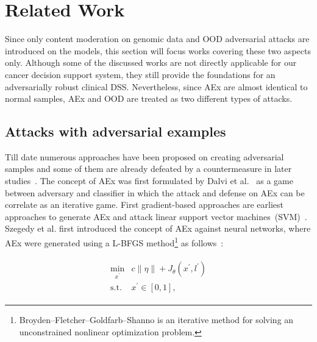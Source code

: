 
\section{Related Work} \label{chapter_6:rw}
Since only content moderation on genomic data and OOD adversarial attacks are introduced on the models, this section will focus works covering these two aspects only. Although some of the discussed works are not directly applicable for our cancer decision support system, they still provide the foundations for an  adversarially robust clinical DSS. Nevertheless, since AEx are almost identical to normal samples, AEx and OOD are treated as two different types of attacks. 

\subsection{Attacks with adversarial examples}
Till date numerous approaches have been proposed on creating adversarial samples and some of them are already defeated by a countermeasure in later studies~\cite{yuan2019adversarial}. The concept of AEx was first formulated by Dalvi et al.~\cite{dalvi2004adversarial} as a game between adversary and classifier in which the attack and defense on AEx can be correlate as an iterative game. First gradient-based approaches are earliest approaches to generate AEx and attack linear support vector machines~(SVM)~\cite{biggio2013evasion}. Szegedy et al.\cite{szegedy2013intriguing} first introduced the concept of AEx against neural networks, where AEx were generated using a L-BFGS method\footnote{ Broyden–Fletcher–Goldfarb–Shanno is an iterative method for solving an unconstrained nonlinear optimization problem.} as follows~\cite{yuan2019adversarial}:

\vspace{-6mm}
\begin{align}
    \begin{array}{cl}
        \min _{x^{\prime}} & c\|\eta\|+J_{\theta}\left(x^{\prime}, l^{\prime}\right) \\
         \text {s.t.} & x^{\prime} \in[0,1],
    \end{array}
    \label{eq:fgsm_aex}
\end{align}

